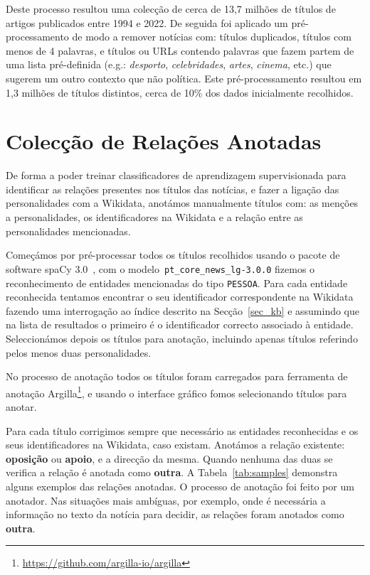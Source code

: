 \documentclass[a4paper, twocolumn, 11pt, twoside]{article}
\begin{document}
Deste processo resultou uma colecção de cerca de 13,7 milhões de títulos de artigos publicados entre 1994 e 2022. De seguida foi aplicado um pré-processamento de modo a remover notícias com: títulos duplicados, títulos com menos de 4 palavras, e títulos ou URLs contendo palavras que fazem partem de uma lista pré-definida (e.g.: \textit{desporto}, \textit{celebridades}, \textit{artes}, \textit{cinema}, etc.) que sugerem um outro contexto que não política. Este pré-processamento resultou em 1,3 milhões de títulos distintos, cerca de 10\% dos dados inicialmente recolhidos.

\section{Colecção de Relações Anotadas}
\label{sec:rel_data_annot}

De forma a poder treinar classificadores de aprendizagem supervisionada para identificar as relações presentes nos títulos das notícias, e fazer a ligação das personalidades com a Wikidata, anotámos manualmente títulos com: as menções a personalidades, os identificadores na Wikidata e a relação entre as personalidades mencionadas.

Começámos por pré-processar todos os títulos recolhidos usando o pacote de software spaCy 3.0~\citep{spacy}, com o modelo~\texttt{pt\_core\_news\_lg-3.0.0} fizemos o reconhecimento de entidades mencionadas do tipo \texttt{PESSOA}. Para cada entidade reconhecida tentamos encontrar o seu identificador correspondente na Wikidata fazendo uma interrogação ao índice descrito na Secção~\ref{sec_kb} e assumindo que na lista de resultados o primeiro é o identificador correcto associado à entidade. Seleccionámos depois os títulos para anotação, incluindo apenas títulos referindo pelos menos duas personalidades.

No processo de anotação todos os títulos foram carregados para ferramenta de anotação Argilla\footnote{\url{https://github.com/argilla-io/argilla}}, e usando o interface gráfico fomos selecionando títulos para anotar. 

Para cada título corrigimos sempre que necessário as entidades reconhecidas e os seus identificadores na Wikidata, caso existam. Anotámos a relação existente: \textbf{oposição} ou \textbf{apoio}, e a direcção da mesma. Quando nenhuma das duas se verifica a relação é anotada como \textbf{outra}. A Tabela~\ref{tab:samples} demonstra alguns exemplos das relações anotadas. O processo de anotação foi feito por um anotador. Nas situações mais ambíguas, por exemplo, onde é necessária a informação no texto da notícia para decidir, as relações foram anotados como \textbf{outra}.
\end{document}
